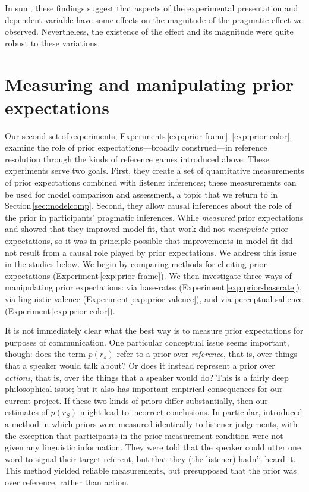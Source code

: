 \documentclass[man,noapacite]{apa2}
\newcounter{Experiment}
\newcommand{\exptref}[1]{Experiment\,\ref{#1}}
\newcommand{\exptrefrange}[2]{Experiments\,\ref{#1}--\ref{#2}}
\newcommand{\secref}[1]{Section\,\ref{#1}}
\begin{document}
In sum, these findings suggest that aspects of the experimental presentation and dependent variable have some effects on the magnitude of the pragmatic effect we observed. Nevertheless, the existence of the effect and its magnitude were quite robust to these variations.

\section{Measuring and manipulating prior expectations}
\label{sec:prior}

Our second set of experiments, \exptrefrange{exp:prior-frame}{exp:prior-color}, examine the role of prior expectations---broadly construed---in reference resolution through the kinds of reference games introduced above. These experiments serve two goals. First, they create a set of quantitative measurements of prior expectations combined with listener inferences; these measurements can be used for model comparison and assessment, a topic that we return to in \secref{sec:modelcomp}. Second, they allow causal inferences about the role of the prior in participants' pragmatic inferences. While  \emph{measured} prior expectations and showed that they improved model fit, that work did not \emph{manipulate} prior expectations, so it was in principle possible that improvements in model fit did not result from a causal role played by prior expectations. We address this issue in the studies below. We begin by comparing methods for eliciting prior expectations (\exptref{exp:prior-frame}). We then investigate three ways of manipulating prior expectations: via base-rates (\exptref{exp:prior-baserate}), via linguistic valence (\exptref{exp:prior-valence}), and via perceptual salience (\exptref{exp:prior-color}).

It is not immediately clear what the best way is to measure prior expectations for purposes of communication. One particular conceptual issue seems important, though: does the term $p(r_s)$ refer to a prior over \emph{reference}, that is, over things that a speaker would talk about? Or does it instead represent a prior over \emph{actions}, that is, over the things that a speaker would do? This is a fairly deep philosophical issue; but it also has important empirical consequences for our current project. If these two kinds of priors differ substantially, then our estimates of $p(r_S)$ might lead to incorrect conclusions. In particular,  introduced a method in which priors were measured identically to listener judgements, with the exception that participants in the prior measurement condition were not given any linguistic information. They were told that the speaker could utter one word to signal their target referent, but that they (the listener) hadn't heard it. This method yielded reliable measurements, but presupposed that the prior was over reference, rather than action.
\end{document}
